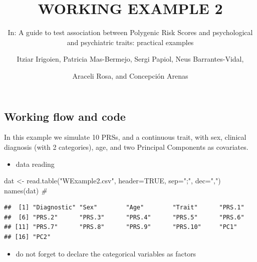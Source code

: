 \documentclass[
]{article}
\title{WORKING EXAMPLE 2}
\subtitle{In: A guide to test association between Polygenic Risk Scores
and psychological and psychiatric traits: practical examples}
\author{Itziar Irigoien, Patricia Mas-Bermejo, Sergi Papiol, Neus
Barrantes-Vidal, \and Araceli Rosa, and Concepción Arenas}
\date{}
\newenvironment{Shaded}{\begin{snugshade}}{\end{snugshade}}
\newcommand{\AttributeTok}[1]{\textcolor[rgb]{0.77,0.63,0.00}{#1}}
\newcommand{\CommentTok}[1]{\textcolor[rgb]{0.56,0.35,0.01}{\textit{#1}}}
\newcommand{\ConstantTok}[1]{\textcolor[rgb]{0.00,0.00,0.00}{#1}}
\newcommand{\FunctionTok}[1]{\textcolor[rgb]{0.00,0.00,0.00}{#1}}
\newcommand{\NormalTok}[1]{#1}
\newcommand{\OtherTok}[1]{\textcolor[rgb]{0.56,0.35,0.01}{#1}}
\newcommand{\SpecialCharTok}[1]{\textcolor[rgb]{0.00,0.00,0.00}{#1}}
\newcommand{\StringTok}[1]{\textcolor[rgb]{0.31,0.60,0.02}{#1}}
\providecommand{\tightlist}{%
  \setlength{\itemsep}{0pt}\setlength{\parskip}{0pt}}
\begin{document}
\maketitle

\hypertarget{working-flow-and-code}{%
\subsection{Working flow and code}\label{working-flow-and-code}}

In this example we simulate 10 PRSs, and a continuous trait, with sex,
clinical diagnosis (with 2 categories), age, and two Principal
Components as covariates.

\begin{itemize}
\tightlist
\item
  data reading
\end{itemize}

\begin{Shaded}
\begin{Highlighting}[]
\NormalTok{dat }\OtherTok{\textless{}{-}} \FunctionTok{read.table}\NormalTok{(}\StringTok{"WExample2.csv"}\NormalTok{, }\AttributeTok{header=}\ConstantTok{TRUE}\NormalTok{, }\AttributeTok{sep=}\StringTok{";"}\NormalTok{, }\AttributeTok{dec=}\StringTok{","}\NormalTok{)}
\FunctionTok{names}\NormalTok{(dat) }\CommentTok{\#}
\end{Highlighting}
\end{Shaded}

\begin{verbatim}
##  [1] "Diagnostic" "Sex"        "Age"        "Trait"      "PRS.1"     
##  [6] "PRS.2"      "PRS.3"      "PRS.4"      "PRS.5"      "PRS.6"     
## [11] "PRS.7"      "PRS.8"      "PRS.9"      "PRS.10"     "PC1"       
## [16] "PC2"
\end{verbatim}

\bigskip

\begin{itemize}
\tightlist
\item
  do not forget to declare the categorical variables as factors
\end{itemize}

\begin{Shaded}
\end{Shaded}
\end{document}
